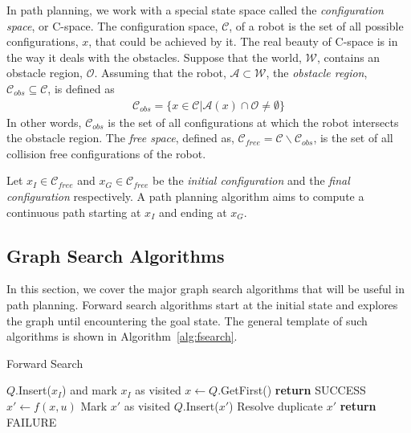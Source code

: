 In path planning, we work with a special state space called the \textit{configuration space}, or C-space. The configuration space, $\mathcal{C}$, of a robot is the set of all possible configurations, $x$, that could be achieved by it. The real beauty of C-space is in the way it deals with the obstacles. Suppose that the world, $\mathcal{W}$, contains an obstacle region, $
\mathcal{O}$. Assuming that the robot, $\mathcal{A}\subset\mathcal{W}$, the \textit{obstacle region}, $\mathcal{C}_{obs}\subseteq\mathcal{C}$, is defined as
\begin{align}
	\mathcal{C}_{obs} = \{x\in\mathcal{C} | \mathcal{A}(x)\cap\mathcal{O}\neq\emptyset\}
\end{align}
In other words, $\mathcal{C}_{obs}$ is the set of all configurations at which the robot intersects the obstacle region. The \textit{free space}, defined as, $\mathcal{C}_{free} = \mathcal{C} \backslash  \mathcal{C}_{obs}$, is the set of all collision free configurations of the robot. 

Let $x_I \in \mathcal{C}_{free}$ and $x_G \in \mathcal{C}_{free}$ be the \textit{initial configuration} and  the \textit{final configuration} respectively. A path planning algorithm aims to compute a continuous path starting at $x_I$ and ending at $x_G$. 

\subsection{Graph Search Algorithms}
\label{sec:graph_search_algo}
In this section, we cover the major graph search algorithms that will be useful in path planning. Forward search algorithms start at the initial state and explores the graph until encountering the goal state. The general template of such algorithms \cite{lavalle2006planning} is shown in Algorithm~\ref{alg:fsearch}.

\begin{algorithm}
\caption{Forward Search}\label{alg:fsearch}
\begin{algorithmic}[1]
\State $Q$.Insert($x_I$) and mark $x_I$ as visited
\State $x\gets Q$.GetFirst()
\State \textbf{return} SUCCESS
\EndIf
{}
\State $x'\gets f(x,u)$
\State Mark $x'$ as visited
\State $Q$.Insert($x'$)
\Else
\State Resolve duplicate $x'$
\EndIf
\EndFor
\EndWhile
\State \textbf{return} FAILURE
\end{algorithmic}
\end{algorithm}

